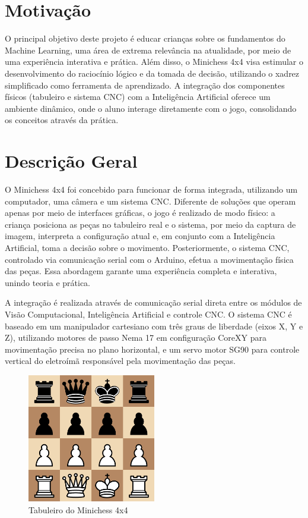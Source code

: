 \documentclass[a4paper,12pt]{article}
\begin{document}
\section{Motivação}  
O principal objetivo deste projeto é educar crianças sobre os fundamentos do Machine Learning, uma área de extrema relevância na atualidade, por meio de uma experiência interativa e prática. Além disso, o Minichess 4x4 visa estimular o desenvolvimento do raciocínio lógico e da tomada de decisão, utilizando o xadrez simplificado como ferramenta de aprendizado. A integração dos componentes físicos (tabuleiro e sistema CNC) com a Inteligência Artificial oferece um ambiente dinâmico, onde o aluno interage diretamente com o jogo, consolidando os conceitos através da prática.  

\section{Descrição Geral}  
O Minichess 4x4 foi concebido para funcionar de forma integrada, utilizando um computador, uma câmera e um sistema CNC. Diferente de soluções que operam apenas por meio de interfaces gráficas, o jogo é realizado de modo físico: a criança posiciona as peças no tabuleiro real e o sistema, por meio da captura de imagem, interpreta a configuração atual e, em conjunto com a Inteligência Artificial, toma a decisão sobre o movimento. Posteriormente, o sistema CNC, controlado via comunicação serial com o Arduino, efetua a movimentação física das peças. Essa abordagem garante uma experiência completa e interativa, unindo teoria e prática.  

A integração é realizada através de comunicação serial direta entre os módulos de Visão Computacional, Inteligência Artificial e controle CNC. O sistema CNC é baseado em um manipulador cartesiano com três graus de liberdade (eixos X, Y e Z), utilizando motores de passo Nema 17 em configuração CoreXY para movimentação precisa no plano horizontal, e um servo motor SG90 para controle vertical do eletroímã responsável pela movimentação das peças.  

\begin{figure}[H]  
    \centering  
    \includegraphics[width=0.5\textwidth]{images/minichess4x4.png}   
    \caption{Tabuleiro do Minichess 4x4}  
    \label{fig:modelo_cnc}  
\end{figure}  
\end{document}
